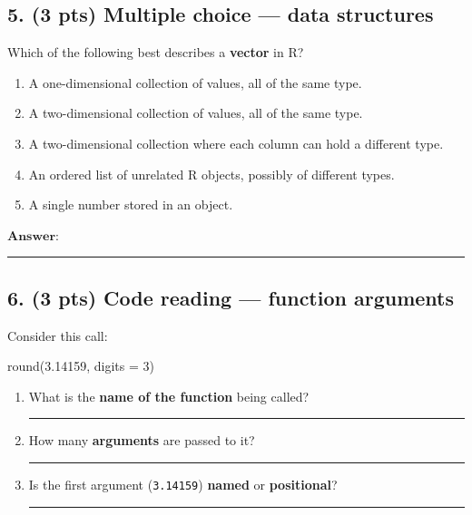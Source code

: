 \documentclass[
  11pt,
  letterpaper,
  DIV=11,
  numbers=noendperiod]{scrartcl}
\newenvironment{Shaded}{\begin{snugshade}}{\end{snugshade}}
\newcommand{\AttributeTok}[1]{\textcolor[rgb]{0.40,0.45,0.13}{#1}}
\newcommand{\DecValTok}[1]{\textcolor[rgb]{0.68,0.00,0.00}{#1}}
\newcommand{\FloatTok}[1]{\textcolor[rgb]{0.68,0.00,0.00}{#1}}
\newcommand{\FunctionTok}[1]{\textcolor[rgb]{0.28,0.35,0.67}{#1}}
\newcommand{\NormalTok}[1]{\textcolor[rgb]{0.00,0.23,0.31}{#1}}
\providecommand{\tightlist}{%
  \setlength{\itemsep}{0pt}\setlength{\parskip}{0pt}}
\begin{document}
\vspace{0.5em}

\subsection{5. (3 pts) Multiple choice --- data structures}

Which of the following best describes a \textbf{vector} in R?

\vspace{0.25em}

\begin{enumerate}
\def\labelenumi{(\Alph{enumi})}
\tightlist
\item A one-dimensional collection of values, all of the same type.
\item A two-dimensional collection of values, all of the same type.
\item A two-dimensional collection where each column can hold a different type.
\item An ordered list of unrelated R objects, possibly of different types.
\item A single number stored in an object.
\end{enumerate}

\vspace{0.25em}

$\textbf{Answer:}$ \rule{1in}{0.4pt}

\newpage

\subsection{6. (3 pts) Code reading --- function arguments}

Consider this call:

\begin{Shaded}
\begin{Highlighting}[]
\FunctionTok{round}\NormalTok{(}\FloatTok{3.14159}\NormalTok{, }\AttributeTok{digits =} \DecValTok{3}\NormalTok{)}
\end{Highlighting}
\end{Shaded}

\vspace{0.25em}

\begin{enumerate}
\def\labelenumi{(\alph{enumi})}
\item What is the \textbf{name of the function} being called?

  \rule{2in}{0.4pt}
\item How many \textbf{arguments} are passed to it?

  \rule{1in}{0.4pt}
\item Is the first argument (\texttt{3.14159}) \textbf{named} or \textbf{positional}?

  \rule{1.5in}{0.4pt}
\end{enumerate}
\end{document}
